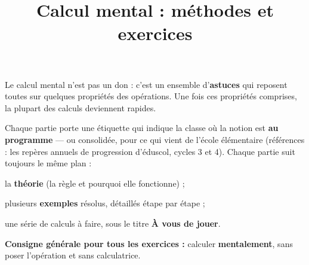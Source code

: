\documentclass[11pt]{exam}
\title{Calcul mental : méthodes et exercices}
\author{}
\date{}
\begin{document}
{\let\newpage\relax\maketitle}

\begin{aretenir}[title={À quoi sert ce document ?}]
Le calcul mental n'est pas un don : c'est un ensemble d'\textbf{astuces} qui reposent
toutes sur quelques propriétés des opérations. Une fois ces propriétés comprises,
la plupart des calculs deviennent rapides.

Chaque partie porte une étiquette qui indique la classe où la notion est
\textbf{au programme} --- ou consolidée, pour ce qui vient de l'école élémentaire
(références : les repères annuels de progression d'éduscol, cycles 3 et 4). Chaque
partie suit toujours le même plan :

\begin{compactitem}
\item la \textbf{théorie} (la règle et pourquoi elle fonctionne) ;
\item plusieurs \textbf{exemples} résolus, détaillés étape par étape ;
\item une série de calculs à faire, sous le titre \textbf{À vous de jouer}.
\end{compactitem}

\textbf{Consigne générale pour tous les exercices :} calculer \textbf{mentalement},
sans poser l'opération et sans calculatrice.
\end{aretenir}

\tableofcontents
\newpage


\end{document}
